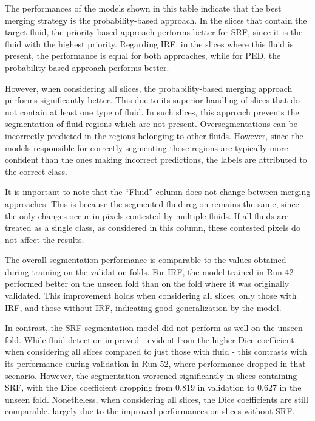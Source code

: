 The performances of the models shown in this table indicate that the best merging strategy is the probability-based approach. In the slices that contain the target fluid, the priority-based approach performs better for SRF, since it is the fluid with the highest priority. Regarding IRF, in the slices where this fluid is present, the performance is equal for both approaches, while for PED, the probability-based approach performs better.
\par
However, when considering all slices, the probability-based merging approach performs significantly better. This due to its superior handling of slices that do not contain at least one type of fluid. In such slices, this approach prevents the segmentation of fluid regions which are not present. Oversegmentations can be incorrectly predicted in the regions belonging to other fluids. However, since the models responsible for correctly segmenting those regions are typically more confident than the ones making incorrect predictions, the labels are attributed to the correct class.
\par
It is important to note that the ``Fluid'' column does not change between merging approaches. This is because the segmented fluid region remains the same, since the only changes occur in pixels contested by multiple fluids. If all fluids are treated as a single class, as considered in this column, these contested pixels do not affect the results.
\par
The overall segmentation performance is comparable to the values obtained during training on the validation folds. For IRF, the model trained in Run 42 performed better on the unseen fold than on the fold where it was originally validated. This improvement holds when considering all slices, only those with IRF, and those without IRF, indicating good generalization by the model.
\par
In contrast, the SRF segmentation model did not perform as well on the unseen fold. While fluid detection improved - evident from the higher Dice coefficient when considering all slices compared to just those with fluid - this contrasts with its performance during validation in Run 52, where performance dropped in that scenario. However, the segmentation worsened significantly in slices containing SRF, with the Dice coefficient dropping from 0.819 in  validation to 0.627 in the unseen fold. Nonetheless, when considering all slices, the Dice coefficients are still comparable, largely due to the improved performances on slices without SRF.
\par
